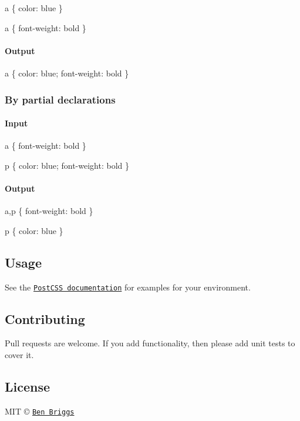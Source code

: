 \begin{DoxyCode}
a \{
    color: blue
\}

a \{
    font-weight: bold
\}
\end{DoxyCode}


\paragraph*{Output}


\begin{DoxyCode}
a \{
    color: blue;
    font-weight: bold
\}
\end{DoxyCode}


\subsubsection*{By partial declarations}

\paragraph*{Input}


\begin{DoxyCode}
a \{
    font-weight: bold
\}

p \{
    color: blue;
    font-weight: bold
\}
\end{DoxyCode}


\paragraph*{Output}


\begin{DoxyCode}
a,p \{
    font-weight: bold
\}

p \{
    color: blue
\}
\end{DoxyCode}


\subsection*{Usage}

See the \href{https://github.com/postcss/postcss#usage}{\tt Post\+C\+SS documentation} for examples for your environment.

\subsection*{Contributing}

Pull requests are welcome. If you add functionality, then please add unit tests to cover it.

\subsection*{License}

M\+IT © \href{http://beneb.info}{\tt Ben Briggs} 